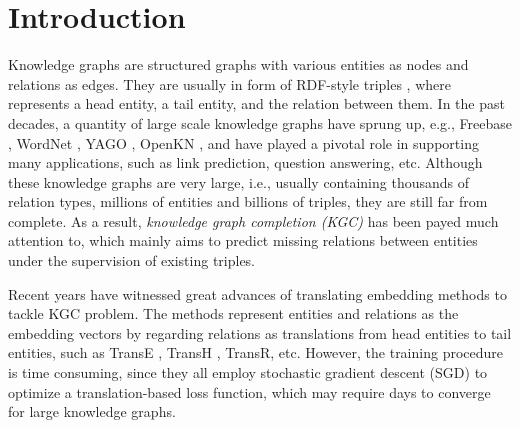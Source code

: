 \documentclass[sigconf]{acmart}
\begin{document}





\maketitle

\section{Introduction}




Knowledge graphs are structured graphs with various entities as nodes and relations as edges. 
They are usually in form of RDF-style triples , where  represents a head entity,  a tail entity, and  the relation between them. 
In the past decades, a quantity of large scale knowledge graphs have sprung up, e.g., Freebase \cite{bollacker2008freebase}, WordNet \cite{miller1995wordnet}, YAGO \cite{Mahdisoltani2014YAGO3}, OpenKN \cite{jia2014openkn}, and  have played a pivotal role in supporting many applications, such as link prediction, question answering, etc.
Although these knowledge graphs are very large, i.e., usually containing thousands of relation types, millions of entities and billions of triples, they are still far from complete. 
As a result, \emph{knowledge graph completion (KGC)} has been payed much attention to, which mainly aims to predict missing relations between entities under the supervision of existing triples. 


Recent years have witnessed great advances of translating embedding methods to tackle KGC problem. The methods represent entities and relations as the embedding vectors by regarding relations as translations from head entities to tail entities, such as TransE \cite{bordes2013translating}, TransH \cite{Wang2014Knowledge}, TransR\cite{Lin2015Learning}, etc.
However, the training procedure is time consuming, 
since they all employ stochastic gradient descent (SGD) to optimize a translation-based loss function, which may require days to converge for large knowledge graphs. 
\end{document}
